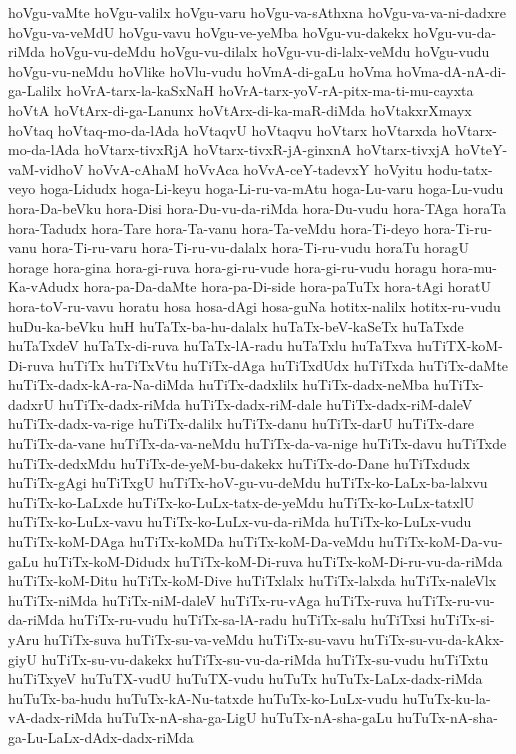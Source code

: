 {hoVgu-vaMte
hoVgu-valilx
hoVgu-varu
hoVgu-va-sAthxna
hoVgu-va-va-ni-dadxre
hoVgu-va-veMdU
hoVgu-vavu
hoVgu-ve-yeMba
hoVgu-vu-dakekx
hoVgu-vu-da-riMda
hoVgu-vu-deMdu
hoVgu-vu-dilalx
hoVgu-vu-di-lalx-veMdu
hoVgu-vudu
hoVgu-vu-neMdu
hoVlike
hoVlu-vudu
hoVmA-di-gaLu
hoVma
hoVma-dA-nA-di-ga-Lalilx
hoVrA-tarx-la-kaSxNaH
hoVrA-tarx-yoV-rA-pitx-ma-ti-mu-cayxta
hoVtA
hoVtArx-di-ga-Lanunx
hoVtArx-di-ka-maR-diMda
hoVtakxrXmayx
hoVtaq
hoVtaq-mo-da-lAda
hoVtaqvU
hoVtaqvu
hoVtarx
hoVtarxda
hoVtarx-mo-da-lAda
hoVtarx-tivxRjA
hoVtarx-tivxR-jA-ginxnA
hoVtarx-tivxjA
hoVteY-vaM-vidhoV
hoVvA-cAhaM
hoVvAca
hoVvA-ceY-tadevxY
hoVyitu
hodu-tatx-veyo
hoga-Lidudx
hoga-Li-keyu
hoga-Li-ru-va-mAtu
hoga-Lu-varu
hoga-Lu-vudu
hora-Da-beVku
hora-Disi
hora-Du-vu-da-riMda
hora-Du-vudu
hora-TAga
horaTa
hora-Tadudx
hora-Tare
hora-Ta-vanu
hora-Ta-veMdu
hora-Ti-deyo
hora-Ti-ru-vanu
hora-Ti-ru-varu
hora-Ti-ru-vu-dalalx
hora-Ti-ru-vudu
horaTu
horagU
horage
hora-gina
hora-gi-ruva
hora-gi-ru-vude
hora-gi-ru-vudu
horagu
hora-mu-Ka-vAdudx
hora-pa-Da-daMte
hora-pa-Di-side
hora-paTuTx
hora-tAgi
horatU
hora-toV-ru-vavu
horatu
hosa
hosa-dAgi
hosa-guNa
hotitx-nalilx
hotitx-ru-vudu
huDu-ka-beVku
huH
huTaTx-ba-hu-dalalx
huTaTx-beV-kaSeTx
huTaTxde
huTaTxdeV
huTaTx-di-ruva
huTaTx-lA-radu
huTaTxlu
huTaTxva
huTiTX-koM-Di-ruva
huTiTx
huTiTxVtu
huTiTx-dAga
huTiTxdUdx
huTiTxda
huTiTx-daMte
huTiTx-dadx-kA-ra-Na-diMda
huTiTx-dadxlilx
huTiTx-dadx-neMba
huTiTx-dadxrU
huTiTx-dadx-riMda
huTiTx-dadx-riM-dale
huTiTx-dadx-riM-daleV
huTiTx-dadx-va-rige
huTiTx-dalilx
huTiTx-danu
huTiTx-darU
huTiTx-dare
huTiTx-da-vane
huTiTx-da-va-neMdu
huTiTx-da-va-nige
huTiTx-davu
huTiTxde
huTiTx-dedxMdu
huTiTx-de-yeM-bu-dakekx
huTiTx-do-Dane
huTiTxdudx
huTiTx-gAgi
huTiTxgU
huTiTx-hoV-gu-vu-deMdu
huTiTx-ko-LaLx-ba-lalxvu
huTiTx-ko-LaLxde
huTiTx-ko-LuLx-tatx-de-yeMdu
huTiTx-ko-LuLx-tatxlU
huTiTx-ko-LuLx-vavu
huTiTx-ko-LuLx-vu-da-riMda
huTiTx-ko-LuLx-vudu
huTiTx-koM-DAga
huTiTx-koMDa
huTiTx-koM-Da-veMdu
huTiTx-koM-Da-vu-gaLu
huTiTx-koM-Didudx
huTiTx-koM-Di-ruva
huTiTx-koM-Di-ru-vu-da-riMda
huTiTx-koM-Ditu
huTiTx-koM-Dive
huTiTxlalx
huTiTx-lalxda
huTiTx-naleVlx
huTiTx-niMda
huTiTx-niM-daleV
huTiTx-ru-vAga
huTiTx-ruva
huTiTx-ru-vu-da-riMda
huTiTx-ru-vudu
huTiTx-sa-lA-radu
huTiTx-salu
huTiTxsi
huTiTx-si-yAru
huTiTx-suva
huTiTx-su-va-veMdu
huTiTx-su-vavu
huTiTx-su-vu-da-kAkx-giyU
huTiTx-su-vu-dakekx
huTiTx-su-vu-da-riMda
huTiTx-su-vudu
huTiTxtu
huTiTxyeV
huTuTX-vudU
huTuTX-vudu
huTuTx
huTuTx-LaLx-dadx-riMda
huTuTx-ba-hudu
huTuTx-kA-Nu-tatxde
huTuTx-ko-LuLx-vudu
huTuTx-ku-la-vA-dadx-riMda
huTuTx-nA-sha-ga-LigU
huTuTx-nA-sha-gaLu
huTuTx-nA-sha-ga-Lu-LaLx-dAdx-dadx-riMda
}

